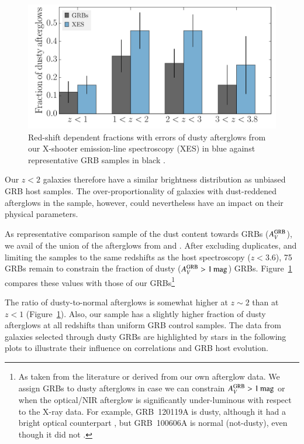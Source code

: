 \documentclass[traditabstract, longauth]{aa}
\begin{document}
\begin{figure}
\includegraphics[angle=0, width=0.99\columnwidth]{Figs/DustyFrac.pdf}
\caption{Red-shift dependent fractions with errors of dusty afterglows from our X-shooter emission-line spectroscopy (XES) in blue against representative GRB samples in black \citep{2011A&A...526A..30G, 2013MNRAS.432.1231C}.}
\label{fig:dustyfrac}
\end{figure}

{Our $z<2$ galaxies therefore have a similar brightness distribution as unbiased GRB host samples. The over-proportionality of galaxies with dust-reddened afterglows in the sample, however, could nevertheless have an impact on their physical parameters.}

 {As representative comparison sample of the dust content towards GRBs ($A^{\rm{GRB}}_V$), we avail of the union of the afterglows from \citet{2011A&A...526A..30G} and \citet{2013MNRAS.432.1231C}. After excluding duplicates, and limiting the samples to the same redshifts as the host spectroscopy ($z<3.6$), 75 GRBs remain to constrain the fraction of dusty ($A^{\rm{GRB}}_V>1\,\rm{mag}$) GRBs.} {Figure~\ref{fig:dustyfrac} compares these values with those of our GRBs\footnote{As taken from the literature \citep{2009ApJ...693.1484C, 2011A&A...534A.108K, 2015arXiv150402482P} or derived from our own afterglow data. We assign GRBs to dusty afterglows in case we can constrain $A^{\rm{GRB}}_V>1\,\rm{mag}$ or when the optical/NIR afterglow is significantly under-luminous with respect to the X-ray data. For example, GRB~120119A is dusty, although it had a bright optical counterpart \citep{2014MNRAS.440.1810M}, but GRB~100606A is normal (not-dusty), even though it did not \citep{2010GCN..10835...1N}.}} 

 {The ratio of dusty-to-normal afterglows is somewhat higher at $z\sim2$ than at $z<1$ (Figure~\ref{fig:dustyfrac}). Also, our sample has a slightly higher fraction of dusty afterglows at all redshifts than uniform GRB control samples. The data from galaxies selected through dusty GRBs are highlighted by stars in the following plots to illustrate their influence on correlations and GRB host evolution.}
\end{document}
